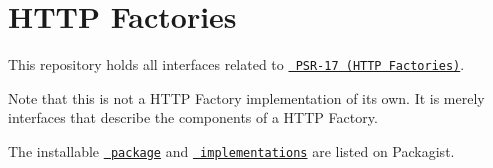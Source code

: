 \chapter{HTTP Factories}
\hypertarget{md_public_2glpi_2vendor_2psr_2http-factory_2_r_e_a_d_m_e}{}\label{md_public_2glpi_2vendor_2psr_2http-factory_2_r_e_a_d_m_e}
This repository holds all interfaces related to \href{https://www.php-fig.org/psr/psr-17/}{\texttt{ PSR-\/17 (HTTP Factories)}}.

Note that this is not a HTTP Factory implementation of its own. It is merely interfaces that describe the components of a HTTP Factory.

The installable \href{https://packagist.org/packages/psr/http-factory}{\texttt{ package}} and \href{https://packagist.org/providers/psr/http-factory-implementation}{\texttt{ implementations}} are listed on Packagist. 
